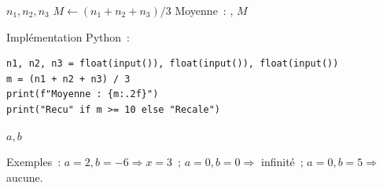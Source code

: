 
\begin{algorithm}[H]
\caption{Moyenne et r\'esultat}
\Lire $n_1, n_2, n_3$\;
$M \leftarrow (n_1 + n_2 + n_3) / 3$\;
\Afficher \og Moyenne~: \fg, $M$\;
\end{algorithm}

Impl\'ementation Python~:
\begin{lstlisting}[style=python]
n1, n2, n3 = float(input()), float(input()), float(input())
m = (n1 + n2 + n3) / 3
print(f"Moyenne : {m:.2f}")
print("Recu" if m >= 10 else "Recale")
\end{lstlisting}


\begin{algorithm}[H]
\caption{R\'esolution de $ax+b=0$}
\Lire $a, b$\;
\end{algorithm}

Exemples~: $a=2, b=-6\Rightarrow x=3$~;
$a=0, b=0\Rightarrow$ infinit\'e~; $a=0, b=5\Rightarrow$ aucune.


